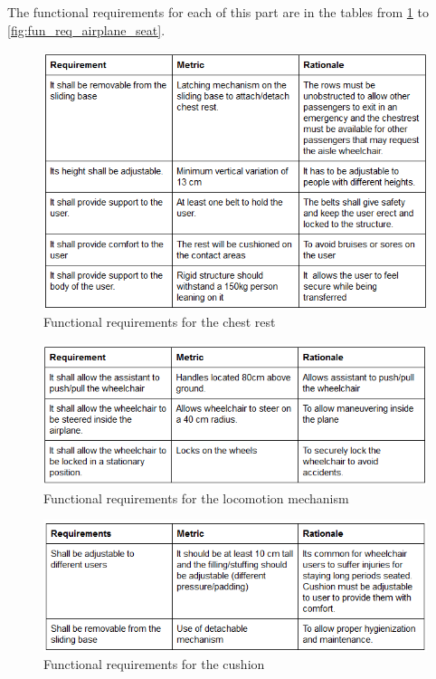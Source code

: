 The functional requirements for each of this part are in the tables from \ref{fig:fun_req_chest_rest} to \ref{fig:fun_req_airplane_seat}.

\newpage

\begin{figure}[h!]
  \centering
     \includegraphics[scale=1]{images/functional_requirements_chest_rest.png}
   \caption{Functional requirements for the chest rest}
  \label{fig:fun_req_chest_rest}
\end{figure}

\newpage

\begin{figure}[h!]
  \centering
     \includegraphics[scale=1]{images/functional_requirements_locomotion_mechanism.png}
   \caption{Functional requirements for the locomotion mechanism}
  \label{fig:fun_req_locomotion_mechanism}
\end{figure}

\newpage

\begin{figure}[h!]
  \centering
     \includegraphics[scale=1]{images/functional_requirements_cushion.png}
   \caption{Functional requirements for the cushion}
  \label{fig:fun_req_cushion}
\end{figure}

